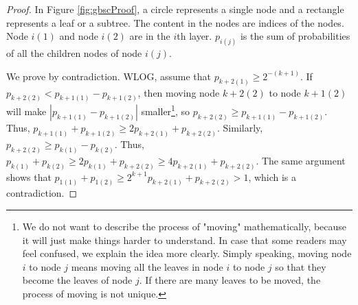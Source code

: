 \begin{proof}





In Figure \ref{fig:gbscProof}, a circle represents a single node and a rectangle  represents a leaf or a subtree. The content in the nodes are indices of the nodes. Node $i(1)$ and node $i(2)$ are in the $i$th layer. $p_{i(j)}$ is the sum of probabilities of all the children nodes of node $i(j)$. 

We prove by contradiction. WLOG, assume that $p_{k+2(1)} \ge 2^{-(k+1)}$. If $p_{k+2(2)} < p_{k+1(1)} - p_{k+1(2)}$, then moving node $k+2(2)$ to node $k+1(2)$ will make $|p_{k+1(1)} - p_{k+1(2)}|$ smaller\footnote{We do not want to describe the process of "moving" mathematically, because it will just make things harder to understand. In case that some readers may feel confused, we explain the idea more clearly. Simply speaking, moving node $i$ to node $j$ means moving all the leaves in node $i$ to node $j$ so that they become the leaves of node $j$. If there are many leaves to be moved, the process of moving is not unique.}, so $p_{k+2(2)} \ge p_{k+1(1)} - p_{k+1(2)}$. Thus, $p_{k+1(1)} + p_{k+1(2)} \ge 2p_{k+2(1)} + p_{k+2(2)}$. Similarly, $p_{k+2(2)} \ge p_{k(1)} - p_{k(2)}$. Thus, $p_{k(1)} + p_{k(2)} \ge 2p_{k(1)} + p_{k+2(2)} \ge 4p_{k+2(1)} + p_{k+2(2)}$. The same argument shows that $p_{1(1)} + p_{1(2)} \ge 2^{k+1}p_{k+2(1)} + p_{k+2(2)} > 1$, which is a contradiction.


\end{proof}

